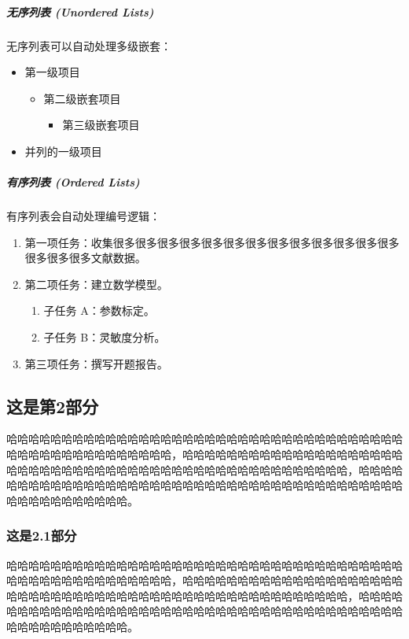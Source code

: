 \documentclass[a4paper,zihao=-4,AutoFakeBold,AutoFakeSlant]{ctexart}
\begin{document}
\subparagraph{无序列表 (Unordered Lists)}

无序列表可以自动处理多级嵌套：

\begin{itemize}
    \item 第一级项目
    \begin{itemize}
        \item 第二级嵌套项目
        \begin{itemize}
            \item 第三级嵌套项目
        \end{itemize}
    \end{itemize}
    \item 并列的一级项目
\end{itemize}

\subparagraph{有序列表 (Ordered Lists)}

有序列表会自动处理编号逻辑：

\begin{enumerate}
    \item 第一项任务：收集很多很多很多很多很多很多很多很多很多很多很多很多很多很多很多很多文献数据。
    \item 第二项任务：建立数学模型。
    \begin{enumerate}
        \item 子任务 A：参数标定。
        \item 子任务 B：灵敏度分析。
    \end{enumerate}
    \item 第三项任务：撰写开题报告。
\end{enumerate}

\subsection{这是第2部分}

哈哈哈哈哈哈哈哈哈哈哈哈哈哈哈哈哈哈哈哈哈哈哈哈哈哈哈哈哈哈哈哈哈哈哈哈哈哈哈哈哈哈哈哈哈哈哈哈哈哈哈，哈哈哈哈哈哈哈哈哈哈哈哈哈哈哈哈哈哈哈哈哈哈哈哈哈哈哈哈哈哈哈哈哈哈哈哈哈哈哈哈哈哈哈哈哈哈哈哈哈哈哈，哈哈哈哈哈哈哈哈哈哈哈哈哈哈哈哈哈哈哈哈哈哈哈哈哈哈哈哈哈哈哈哈哈哈哈哈哈哈哈哈哈哈哈哈哈哈哈哈哈哈哈。

\subsubsection{这是2.1部分}

哈哈哈哈哈哈哈哈哈哈哈哈哈哈哈哈哈哈哈哈哈哈哈哈哈哈哈哈哈哈哈哈哈哈哈哈哈哈哈哈哈哈哈哈哈哈哈哈哈哈哈，哈哈哈哈哈哈哈哈哈哈哈哈哈哈哈哈哈哈哈哈哈哈哈哈哈哈哈哈哈哈哈哈哈哈哈哈哈哈哈哈哈哈哈哈哈哈哈哈哈哈哈，哈哈哈哈哈哈哈哈哈哈哈哈哈哈哈哈哈哈哈哈哈哈哈哈哈哈哈哈哈哈哈哈哈哈哈哈哈哈哈哈哈哈哈哈哈哈哈哈哈哈哈。
\end{document}
